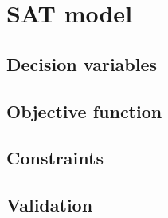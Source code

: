 \section{SAT model}


\subsection{Decision variables}


\subsection{Objective function}


\subsection{Constraints}


\subsection{Validation}
